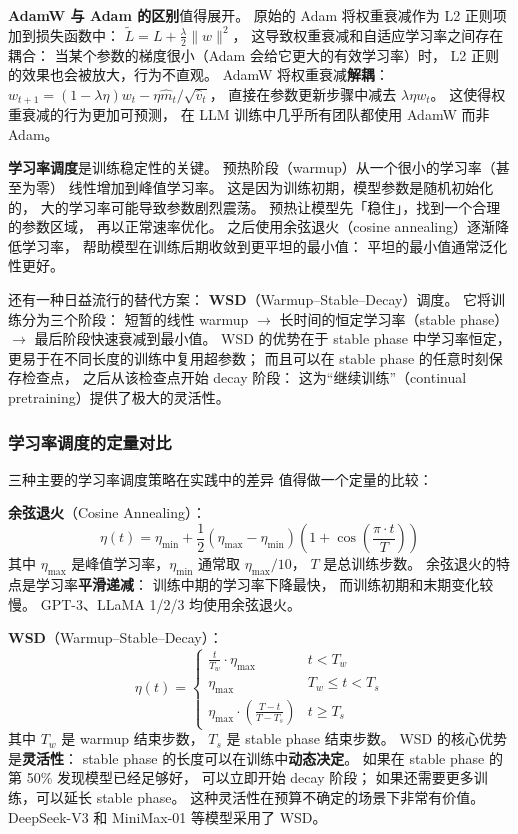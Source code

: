 \textbf{AdamW 与 Adam 的区别}值得展开。
原始的 Adam 将权重衰减作为 L2 正则项加到损失函数中：
$\tilde{L} = L + \frac{\lambda}{2}\|w\|^2$，
这导致权重衰减和自适应学习率之间存在耦合：
当某个参数的梯度很小（Adam 会给它更大的有效学习率）时，
L2 正则的效果也会被放大，行为不直观。
AdamW 将权重衰减\textbf{解耦}：
$w_{t+1} = (1 - \lambda \eta) w_t - \eta \hat{m}_t / \sqrt{\hat{v}_t}$，
直接在参数更新步骤中减去 $\lambda \eta w_t$。
这使得权重衰减的行为更加可预测，
在 LLM 训练中几乎所有团队都使用 AdamW 而非 Adam。

\textbf{学习率调度}是训练稳定性的关键。
预热阶段（warmup）从一个很小的学习率（甚至为零）
线性增加到峰值学习率。
这是因为训练初期，模型参数是随机初始化的，
大的学习率可能导致参数剧烈震荡。
预热让模型先「稳住」，找到一个合理的参数区域，
再以正常速率优化。
之后使用余弦退火（cosine annealing）逐渐降低学习率，
帮助模型在训练后期收敛到更平坦的最小值：
平坦的最小值通常泛化性更好。

还有一种日益流行的替代方案：
\textbf{WSD}（Warmup--Stable--Decay）调度。
它将训练分为三个阶段：
短暂的线性 warmup $\to$
长时间的恒定学习率（stable phase）$\to$
最后阶段快速衰减到最小值。
WSD 的优势在于 stable phase 中学习率恒定，
更易于在不同长度的训练中复用超参数；
而且可以在 stable phase 的任意时刻保存检查点，
之后从该检查点开始 decay 阶段：
这为“继续训练”（continual pretraining）提供了极大的灵活性。

\subsubsection{学习率调度的定量对比}

三种主要的学习率调度策略在实践中的差异
值得做一个定量的比较：

\textbf{余弦退火}（Cosine Annealing）：
\begin{equation}
  \eta(t) = \eta_{\min} + \frac{1}{2}(\eta_{\max} - \eta_{\min})
  \left(1 + \cos\left(\frac{\pi \cdot t}{T}\right)\right)
\end{equation}
其中 $\eta_{\max}$ 是峰值学习率，$\eta_{\min}$ 通常取 $\eta_{\max}/10$，
$T$ 是总训练步数。
余弦退火的特点是学习率\textbf{平滑递减}：
训练中期的学习率下降最快，
而训练初期和末期变化较慢。
GPT-3、LLaMA 1/2/3 均使用余弦退火。

\textbf{WSD}（Warmup--Stable--Decay）：
\begin{equation}
  \eta(t) = \begin{cases}
    \frac{t}{T_w} \cdot \eta_{\max} & t < T_w \\
    \eta_{\max} & T_w \leq t < T_s \\
    \eta_{\max} \cdot \left(\frac{T - t}{T - T_s}\right) & t \geq T_s
  \end{cases}
\end{equation}
其中 $T_w$ 是 warmup 结束步数，
$T_s$ 是 stable phase 结束步数。
WSD 的核心优势是\textbf{灵活性}：
stable phase 的长度可以在训练中\textbf{动态决定}。
如果在 stable phase 的第 50\% 发现模型已经足够好，
可以立即开始 decay 阶段；
如果还需要更多训练，可以延长 stable phase。
这种灵活性在预算不确定的场景下非常有价值。
DeepSeek-V3 和 MiniMax-01 等模型采用了 WSD。

